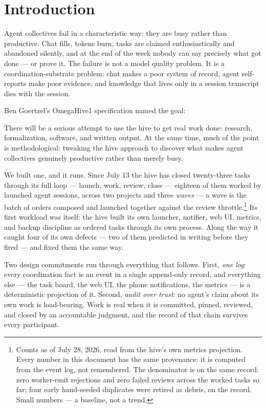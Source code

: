 \section{Introduction}

Agent collectives fail in a characteristic way: they are busy rather than productive. Chat fills, tokens burn, tasks are claimed enthusiastically and abandoned silently, and at the end of the week nobody can say precisely what got done --- or prove it. The failure is not a model quality problem. It is a coordination-substrate problem: chat makes a poor system of record, agent self-reports make poor evidence, and knowledge that lives only in a session transcript dies with the session.

Ben Goertzel's OmegaHive1 specification named the goal:

\begin{benquote}
There will be a serious attempt to use the hive to get real work done: research, formalization, software, and written output. At the same time, much of the point is methodological: tweaking the hive approach to discover what makes agent collectives genuinely productive rather than merely busy.
\end{benquote}

We built one, and it runs. Since July 13 the hive has closed twenty-three tasks through its full loop --- launch, work, review, close --- eighteen of them worked by launched agent sessions, across two projects and three \emph{waves} --- a wave is the batch of orders composed and launched together against the review throttle.\footnote{Counts as of July 28, 2026, read from the hive's own metrics projection. Every number in this document has the same provenance: it is computed from the event log, not remembered. The denominator is on the same record: zero worker-emit rejections and zero failed reviews across the worked tasks so far; four early hand-seeded duplicates were retired as debris, on the record. Small numbers --- a baseline, not a trend.} Its first workload was itself: the hive built its own launcher, notifier, web UI, metrics, and backup discipline as ordered tasks through its own process. Along the way it caught four of its own defects --- two of them predicted in writing before they fired --- and fixed them the same way.

Two design commitments run through everything that follows. First, \emph{one log}: every coordination fact is an event in a single append-only record, and everything else --- the task board, the web UI, the phone notifications, the metrics --- is a deterministic projection of it. Second, \emph{audit over trust}: no agent's claim about its own work is load-bearing. Work is real when it is committed, pinned, reviewed, and closed by an accountable judgment, and the record of that chain survives every participant.

